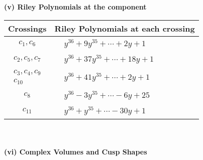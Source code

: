 \documentclass[1p]{elsarticle_modified}
\theoremstyle{definition}
\begin{document}
\newpage\renewcommand{\arraystretch}{1}
\flushleft \textbf{(v) Riley Polynomials at the component}\newline \\
\begin{tabular}{m{50pt}|m{274pt}}
Crossings & \hspace{64pt}Riley Polynomials at each crossing \\
\hline $$\begin{aligned}c_{1},c_{6}\end{aligned}$$&$\begin{aligned}
&y^{36}+9 y^{35}+\cdots+2 y+1
\end{aligned}$\\
\hline $$\begin{aligned}c_{2},c_{5},c_{7}\end{aligned}$$&$\begin{aligned}
&y^{36}+37 y^{35}+\cdots+18 y+1
\end{aligned}$\\
\hline $$\begin{aligned}c_{3},c_{4},c_{9}\\c_{10}\end{aligned}$$&$\begin{aligned}
&y^{36}+41 y^{35}+\cdots+2 y+1
\end{aligned}$\\
\hline $$\begin{aligned}c_{8}\end{aligned}$$&$\begin{aligned}
&y^{36}-3 y^{35}+\cdots-6 y+25
\end{aligned}$\\
\hline $$\begin{aligned}c_{11}\end{aligned}$$&$\begin{aligned}
&y^{36}+y^{35}+\cdots-30 y+1
\end{aligned}$\\
\hline
\end{tabular}\\~\\
\newpage\flushleft \textbf{(vi) Complex Volumes and Cusp Shapes}
\end{document}

